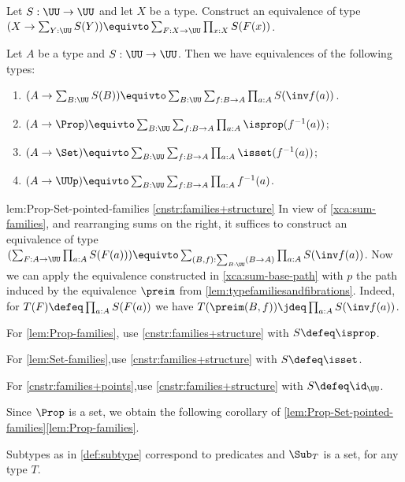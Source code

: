 \begin{xca}\label{xca:sum-families}
Let $S: \UU\to\UU$ and let $X$ be a type.
Construct an equivalence of type
$(X\to\sum_{Y:\UU} S(Y)) \equivto \sum_{F:X\to\UU}\prod_{x:X}S(F(x))$.
\end{xca}

\begin{construction}\label{lem:Prop-Set-pointed-families}
Let $A$ be a type and $S:\UU\to\UU$.
Then we have equivalences of the following types:
\begin{enumerate}
\item\label{cnstr:families+structure}
$(A\to\sum_{B:\UU}S(B)) \equivto
\sum_{B:\UU}\sum_{f:B\to A}\prod_{a:A}S(\inv f(a))$.
\item\label{lem:Prop-families}
$(A\to\Prop) \equivto \sum_{B:\UU}\sum_{f:B\to A}
\prod_{a:A}\isprop({f^{-1}(a)})$;
\item\label{lem:Set-families}
$(A\to\Set) \equivto \sum_{B:\UU}\sum_{f:B\to A}
\prod_{a:A}\isset({f^{-1}(a)})$;
\item\label{cnstr:families+points}
$(A\to\UUp) \equivto \sum_{B:\UU}\sum_{f:B\to A}\prod_{a:A}f^{-1}(a)$.
\end{enumerate}
\end{construction}

\begin{implementation}{lem:Prop-Set-pointed-families}
\ref{cnstr:families+structure}
In view of \cref{xca:sum-families}, and rearranging sums on the right,
it suffices to construct an equivalence of type
$(\sum_{F:A\to\UU}\prod_{a:A}S(F(a))) \equivto
\sum_{(B,f):\sum_{B:\UU}(B\to A)}\prod_{a:A}S(\inv f(a))$.
Now we can apply the equivalence constructed in \cref{xca:sum-base-path}
with $p$ the path induced by the equivalence $\preim$ from
\cref{lem:typefamiliesandfibrations}. Indeed,
for $T(F)\defeq \prod_{a:A}S(F(a))$ we have
$T(\preim(B,f))\jdeq \prod_{a:A}S(\inv f (a))$.

For \ref{lem:Prop-families}, use \ref{cnstr:families+structure}
with $S\defeq \isprop$.

For \ref{lem:Set-families},use \ref{cnstr:families+structure}
with $S\defeq \isset$.

For \ref{cnstr:families+points},use \ref{cnstr:families+structure}
with $S\defeq \id_\UU$.
\end{implementation}

Since $\Prop$ is a set, we obtain the following corollary
of \cref{lem:Prop-Set-pointed-families}\ref{lem:Prop-families}.
\begin{corollary}\label{cor:Sub_T-is-set}
Subtypes as in \cref{def:subtype} correspond to predicates
and $\Sub_T$ is a set, for any type $T$.
\end{corollary}


